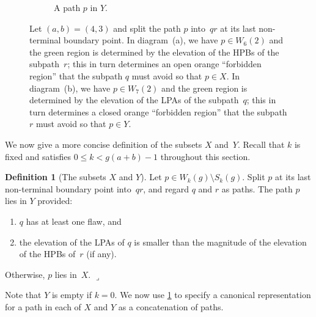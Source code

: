 \documentclass[11pt]{article}
\newcommand{\lrcornerqed}[0]{}
\renewcommand{\lrcornerqed}[0]{\hfill $\lrcorner$} %
\theoremstyle{definition} %
\newtheorem{definition}[thm]{Definition}
\numberwithin{equation}{section}
\begin{document}
\begin{figure}[ht]
\begin{center}
\begin{subfigure}{.4\textwidth}
    \caption{A path $p$ in $Y$.}
    \label{fig:domain_Y}
\end{subfigure}
%
\caption{Let $(a,b) = (4,3)$ and split the path $p$ into~$qr$ at its last non-terminal boundary point.
In diagram~(a), we have $p \in W_6(2)$ and the green region is determined by the elevation of the HPBs of the subpath~$r$; this in turn determines an open orange ``forbidden region'' that the subpath $q$ must avoid so that $p \in X$.
In diagram~(b), we have $p \in W_7(2)$ and the green region is determined by the elevation of the LPAs of the subpath~$q$; this in turn determines a closed orange ``forbidden region'' that the subpath $r$ must avoid so that $p \in Y$.}
\label{fig:domain}
\end{center}
\end{figure}


We now give a more concise definition of the subsets $X$ and~$Y$. Recall that $k$ is fixed and satisfies $0 \leq k < g(a+b)-1$ throughout this section.

\begin{definition}[The subsets $X$ and $Y$]
\label{def:domain_partition}
    Let $p \in W_k(g) \setminus S_k(g)$. Split $p$ at its last non-terminal boundary point into~$q r$, and regard $q$ and $r$ as paths.  
    The path $p$ lies in $Y$ provided:
    \begin{enumerate}[label=\textit{(\roman*)}]
        \item $q$ has at least one flaw, and
        \label{def:domain_partition:condition_1}
        
        \item the elevation of the LPAs of $q$ is smaller than the magnitude of the elevation of the HPBs of~$r$ (if any). 
        \label{def:domain_partition:condition_2}
    \end{enumerate}
    Otherwise, $p$ lies in~$X$. \lrcornerqed
\end{definition}
Note that $Y$ is empty if $k=0$.  We now use \cref{def:domain_partition} to specify a canonical representation for a path in each of $X$ and $Y$ as a concatenation of paths.
\end{document}
